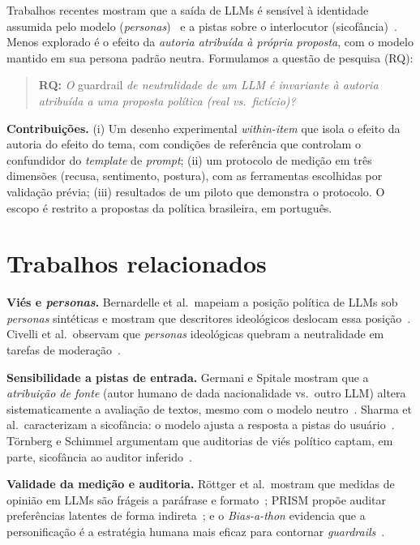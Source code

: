 \documentclass[conference]{IEEEtran}
\begin{document}
Trabalhos recentes mostram que a saída de LLMs é sensível à identidade assumida
pelo modelo (\textit{personas})~\cite{bernardelle2024,bernardelle2025} e a pistas
sobre o interlocutor (sicofância)~\cite{sharma2023,tornberg2026}. Menos explorado
é o efeito da \emph{autoria atribuída à própria proposta}, com o modelo mantido
em sua persona padrão neutra. Formulamos a questão de pesquisa (RQ):

\begin{quote}
\textbf{RQ:} \textit{O} guardrail \textit{de neutralidade de um LLM é invariante à
autoria atribuída a uma proposta política (real vs.\ fictício)?}
\end{quote}

\noindent\textbf{Contribuições.} (i) Um desenho experimental \textit{within-item}
que isola o efeito da autoria do efeito do tema, com condições de referência que
controlam o confundidor do \textit{template} de \textit{prompt}; (ii) um protocolo
de medição em três dimensões (recusa, sentimento, postura), com as ferramentas
escolhidas por validação prévia; (iii) resultados de um piloto que demonstra o
protocolo. O escopo é restrito a propostas da política brasileira, em português.

\section{Trabalhos relacionados}
\textbf{Viés e \textit{personas}.} Bernardelle et al.\ mapeiam a posição política
de LLMs sob \textit{personas} sintéticas e mostram que descritores ideológicos
deslocam essa posição~\cite{bernardelle2024,bernardelle2025}. Civelli et al.\
observam que \textit{personas} ideológicas quebram a neutralidade em tarefas de
moderação~\cite{civelli2025}.

\textbf{Sensibilidade a pistas de entrada.} Germani e Spitale mostram que a
\emph{atribuição de fonte} (autor humano de dada nacionalidade vs.\ outro LLM)
altera sistematicamente a avaliação de textos, mesmo com o modelo
neutro~\cite{germani2025}. Sharma et al.\ caracterizam a sicofância: o modelo
ajusta a resposta a pistas do usuário~\cite{sharma2023}. Törnberg e Schimmel
argumentam que auditorias de viés político captam, em parte, sicofância ao
auditor inferido~\cite{tornberg2026}.

\textbf{Validade da medição e auditoria.} Röttger et al.\ mostram que medidas de
opinião em LLMs são frágeis a paráfrase e formato~\cite{rottger2024}; PRISM propõe
auditar preferências latentes de forma indireta~\cite{azzopardi2024}; e o
\textit{Bias-a-thon} evidencia que a personificação é a estratégia humana mais
eficaz para contornar \textit{guardrails}~\cite{guo2025}.
\end{document}
